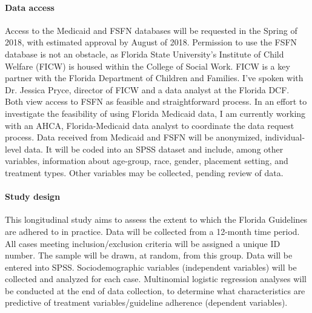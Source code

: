\documentclass[twocolumn, issue, rga, authordate]{jote-new-article}
\begin{document}
\paragraph{Data access} Access to the Medicaid and FSFN databases will be
requested in the Spring of 2018, with estimated approval by August of
2018. Permission to use the FSFN database is not an obstacle, as Florida
State University's Institute of Child Welfare (FICW) is housed within
the College of Social Work. FICW is a key partner with the Florida
Department of Children and Families. I've spoken with Dr. Jessica Pryce,
director of FICW and a data analyst at the Florida DCF. Both view access
to FSFN as feasible and straightforward process. In an effort to
investigate the feasibility of using Florida Medicaid data, I am
currently working with an AHCA, Florida-Medicaid data analyst to
coordinate the data request process. Data received from Medicaid and
FSFN will be anonymized, individual-level data. It will be coded into an
SPSS dataset and include, among other variables, information about
age-group, race, gender, placement setting, and treatment types. Other
variables may be collected, pending review of data.

\paragraph{Study design} This longitudinal study aims to assess the extent
to which the Florida Guidelines are adhered to in practice. Data will be
collected from a 12-month time period. All cases meeting
inclusion/exclusion criteria will be assigned a unique ID number. The
sample will be drawn, at random, from this group. Data will be entered
into SPSS. Sociodemographic variables (independent variables) will be
collected and analyzed for each case. Multinomial logistic regression
analyses will be conducted at the end of data collection, to determine
what characteristics are predictive of treatment variables/guideline
adherence (dependent variables).
\end{document}
